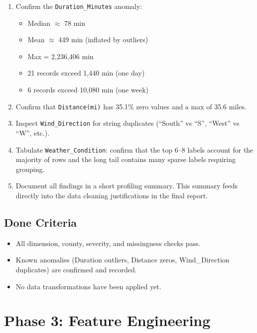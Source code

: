 \documentclass[11pt]{article}
\begin{document}
\begin{enumerate}
  \item Confirm the \texttt{Duration\_Minutes} anomaly:
  \begin{itemize}
    \item Median $\approx$ 78 min
    \item Mean $\approx$ 449 min (inflated by outliers)
    \item Max = 2,236,406 min
    \item 21 records exceed 1,440 min (one day)
    \item 6 records exceed 10,080 min (one week)
  \end{itemize}

  \item Confirm that \texttt{Distance(mi)} has 35.1\% zero values and a max of 35.6 miles.

  \item Inspect \texttt{Wind\_Direction} for string duplicates (``South'' vs ``S'', ``West'' vs ``W'', etc.).

  \item Tabulate \texttt{Weather\_Condition}: confirm that the top 6--8 labels account for the majority of rows and the long tail contains many sparse labels requiring grouping.

  \item Document all findings in a short profiling summary. This summary feeds directly into the data cleaning justifications in the final report.
\end{enumerate}

\subsection{Done Criteria}

\begin{itemize}
  \item All dimension, county, severity, and missingness checks pass.
  \item Known anomalies (Duration outliers, Distance zeros, Wind\_Direction duplicates) are confirmed and recorded.
  \item No data transformations have been applied yet.
\end{itemize}

\newpage
\section{Phase 3: Feature Engineering}
\end{document}
